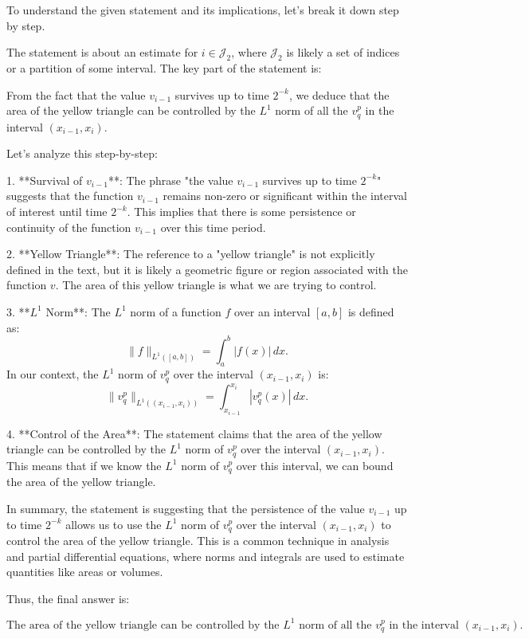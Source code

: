 To understand the given statement and its implications, let's break it down step by step.

The statement is about an estimate for \( i \in \mathcal{J}_2 \), where \(\mathcal{J}_2\) is likely a set of indices or a partition of some interval. The key part of the statement is:

From the fact that the value \( v_{i-1} \) survives up to time \( 2^{-k} \), we deduce that the area of the yellow triangle can be controlled by the \( L^1 \) norm of all the \( v_q^p \) in the interval \( (x_{i-1}, x_i) \).

Let's analyze this step-by-step:

1. **Survival of \( v_{i-1} \)**: The phrase "the value \( v_{i-1} \) survives up to time \( 2^{-k} \)" suggests that the function \( v_{i-1} \) remains non-zero or significant within the interval of interest until time \( 2^{-k} \). This implies that there is some persistence or continuity of the function \( v_{i-1} \) over this time period.

2. **Yellow Triangle**: The reference to a "yellow triangle" is not explicitly defined in the text, but it is likely a geometric figure or region associated with the function \( v \). The area of this yellow triangle is what we are trying to control.

3. **\( L^1 \) Norm**: The \( L^1 \) norm of a function \( f \) over an interval \( [a, b] \) is defined as:
   \[
   \| f \|_{L^1([a, b])} = \int_a^b |f(x)| \, dx.
   \]
   In our context, the \( L^1 \) norm of \( v_q^p \) over the interval \( (x_{i-1}, x_i) \) is:
   \[
   \| v_q^p \|_{L^1((x_{i-1}, x_i))} = \int_{x_{i-1}}^{x_i} |v_q^p(x)| \, dx.
   \]

4. **Control of the Area**: The statement claims that the area of the yellow triangle can be controlled by the \( L^1 \) norm of \( v_q^p \) over the interval \( (x_{i-1}, x_i) \). This means that if we know the \( L^1 \) norm of \( v_q^p \) over this interval, we can bound the area of the yellow triangle.

In summary, the statement is suggesting that the persistence of the value \( v_{i-1} \) up to time \( 2^{-k} \) allows us to use the \( L^1 \) norm of \( v_q^p \) over the interval \( (x_{i-1}, x_i) \) to control the area of the yellow triangle. This is a common technique in analysis and partial differential equations, where norms and integrals are used to estimate quantities like areas or volumes.

Thus, the final answer is:

\[
\boxed{\text{The area of the yellow triangle can be controlled by the } L^1 \text{ norm of all the } v_q^p \text{ in the interval } (x_{i-1}, x_i).}
\]